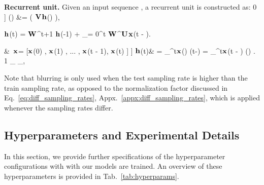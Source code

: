 \documentclass{article}
\newcommand{\mat}[1]{\ensuremath{{\mathbf{\MakeUppercase{{#1}}}}}}
\renewcommand{\vec}[1]{\ensuremath{\mathbf{\MakeLowercase{{#1}}}}}
\newcommand{\Wm}{\mat{W}}
\newcommand{\Vm}{\mat{V}}
\newcommand{\Um}{\mat{U}}
\newcommand{\xv}{\vec{x}}
\newcommand{\yv}{\vec{y}}
\newcommand{\hv}{\vec{h}}
\def\Nt{\mathrm{N}}
\begin{document}
\textbf{Recurrent unit.} Given an input sequence , a recurrent unit is constructed as:
0 \jot]
 \tilde{\yv}(\tau) &= ( \Vm \hv (\tau) ),

\setlength{\abovedisplayskip}{0pt}
\setlength{\belowdisplayskip}{1pt}
    \hv(t) = \Wm^{t+1} \hv(-1) + \sum_{\tau = 0}^{t} \Wm^{\tau}\Um \xv(t - \tau).\label{eq:unroll_t_steps}

     &\ \xv = [\xv(0) , \xv(1) , ... , \xv(t - 1), \xv(t) ] \label{eq:correspondence1} \jot]
       \hv(t)& =  \sum_{}^{t}\xv(\tau) \boldsymbol{\psi}(t-\tau)  = \sum_{}^{t}\xv(t - \tau) \boldsymbol{\psi}(\tau) . \label{eq:correspondence3}      
1   \rightarrow \Nt_{} \times \Nt_{},

\vspace{-2mm}
Note that blurring is only used when the test sampling rate is higher than the train sampling rate, as opposed to the normalization factor  discussed in Eq.~\ref{eq:diff_sampling_rates}, Appx.~\ref{appx:diff_sampling_rates}, which is applied whenever the sampling rates differ.

\subsection{Hyperparameters and Experimental Details}\label{appx:hyperparams}
In this section, we provide further specifications of the hyperparameter configurations with with our models are trained. An overview of these hyperparameters is provided in Tab.~\ref{tab:hyperparams}.
\end{document}
